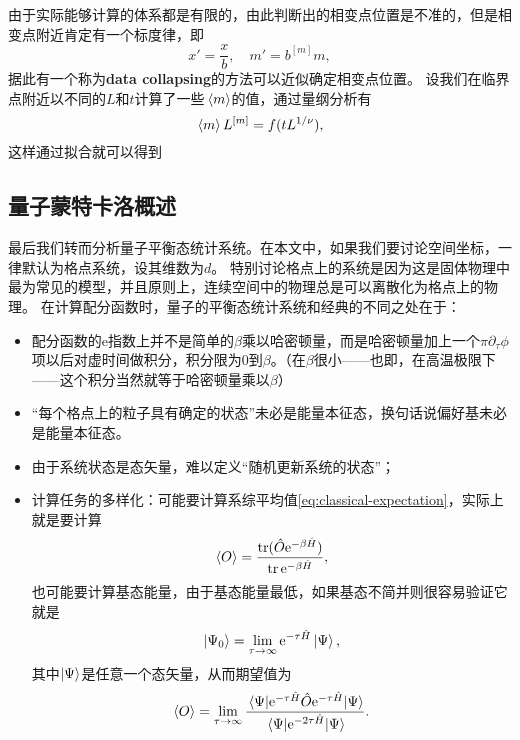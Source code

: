 \documentclass[hyperref, UTF8, a4paper]{ctexart}
\newcommand*{\ee}{\mathrm{e}}
\newcommand*{\concept}[1]{{\textbf{#1}}}
\begin{document}
由于实际能够计算的体系都是有限的，由此判断出的相变点位置是不准的，但是相变点附近肯定有一个标度律，即
\[
    x' = \frac{x}{b}, \quad m' = b^{[m]} m,
\]
据此有一个称为\concept{data collapsing}的方法可以近似确定相变点位置。
设我们在临界点附近以不同的$L$和$t$计算了一些$\expval*{m}$的值，通过量纲分析有 %
\begin{equation}
    \expval*{m} L^{[m]} = f (t L^{1/\nu}),
\end{equation}
这样通过拟合就可以得到

\subsection{量子蒙特卡洛概述}

最后我们转而分析量子平衡态统计系统。在本文中，如果我们要讨论空间坐标，一律默认为格点系统，设其维数为$d$。
特别讨论格点上的系统是因为这是固体物理中最为常见的模型，并且原则上，连续空间中的物理总是可以离散化为格点上的物理。
在计算配分函数时，量子的平衡态统计系统和经典的不同之处在于：
\begin{itemize}
    \item 配分函数的$\ee$指数上并不是简单的$\beta$乘以哈密顿量，而是哈密顿量加上一个$\pi \partial_\tau \phi$项以后对虚时间做积分，积分限为$0$到$\beta$。（在$\beta$很小——也即，在高温极限下——这个积分当然就等于哈密顿量乘以$\beta$）
    \item “每个格点上的粒子具有确定的状态”未必是能量本征态，换句话说偏好基未必是能量本征态。
    \item 由于系统状态是态矢量，难以定义“随机更新系统的状态”；
    \item 计算任务的多样化：可能要计算系综平均值\eqref{eq:classical-expectation}，实际上就是要计算
    \begin{equation}
        \expval{O} = \frac{\trace(\hat{O} \ee^{-\beta \hat{H}})}{\trace \ee^{-\beta \hat{H}}},
        \label{eq:quantum-expectation}
    \end{equation}
    也可能要计算基态能量，由于基态能量最低，如果基态不简并则很容易验证它就是
    \begin{equation}
        \ket{\Psi_0} = \lim_{\tau \to \infty} \ee^{-\tau \hat{H}} \ket{\Psi},
        \label{eq:ground-state-infty}
    \end{equation}
    其中$\ket{\Psi}$是任意一个态矢量，从而期望值为
    \begin{equation}
        \expval{O} = \lim_{\tau \to \infty} \frac{\mel{\Psi}{\ee^{-\tau \hat{H}} \hat{O} \ee^{-\tau \hat{H}}}{\Psi}}{\mel{\Psi}{\ee^{-2\tau \hat{H}}}{\Psi}}.
    \end{equation}
\end{itemize}
\end{document}
